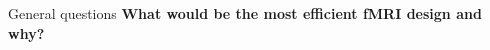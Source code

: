 \documentclass{beamer}
\begin{document}
% 



\begin{frame}{General questions}
  \textbf{What would be the most efficient fMRI design and why?}

% 
\end{frame}

% 
% 


% 
\end{document}
